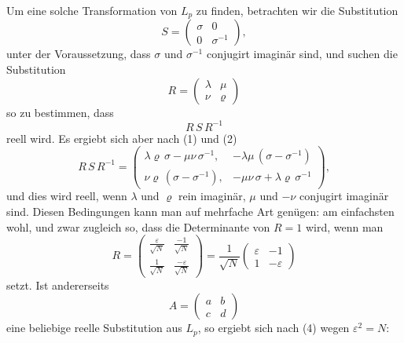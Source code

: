 \documentclass[12pt,a4paper]{article}
\begin{document}
Um eine solche Transformation von $L_{p}$ zu finden, betrachten wir die Substitution
\begin{equation}\label{eq:69.1}
\tag{1}
S = \begin{pmatrix}\sigma&0\\0&\sigma^{-1}\end{pmatrix},
\end{equation}
unter der Voraussetzung, dass $\sigma$ und $\sigma^{-1}$ conjugirt imaginär sind, und suchen die Substitution
\begin{equation}\label{eq:69.2}
\tag{2}
R = \begin{pmatrix}\lambda&\mu\\\nu&\varrho\end{pmatrix}
\end{equation}
so zu bestimmen, dass
\begin{equation}\label{eq:69.3}
\tag{3}
R\,S\,R^{-1}
\end{equation}
reell wird. Es ergiebt sich aber nach (1) und (2)
\[
R\,S\,R^{-1} =
\begin{pmatrix}
\lambda\varrho\,\sigma - \mu\nu\,\sigma^{-1},&
-\lambda\mu\,(\sigma - \sigma^{-1})\\
\nu\varrho\,(\sigma - \sigma^{-1}),&
-\mu\nu\,\sigma + \lambda\varrho\,\sigma^{-1}
\end{pmatrix},
\]
und dies wird reell, wenn $\lambda$ und $\varrho$ rein imaginär, $\mu$ und $-\nu$ conjugirt imaginär sind. Diesen Bedingungen kann man auf mehrfache Art genügen: am einfachsten wohl, und zwar zugleich so, dass die Determinante von $R = 1$ wird, wenn man
\begin{equation}\label{eq:69.4}
\tag{4}
R = \begin{pmatrix}
\frac{\varepsilon}{\sqrt{N}}&\frac{-1}{\sqrt{N}}\\[4pt]
\frac{1}{\sqrt{N}}&\frac{-\varepsilon}{\sqrt{N}}
\end{pmatrix}
= \frac{1}{\sqrt{N}}\begin{pmatrix}\varepsilon&-1\\1&-\varepsilon\end{pmatrix}
\end{equation}
setzt. Ist andererseits
\[
A = \begin{pmatrix}a&b\\c&d\end{pmatrix}
\]
eine beliebige reelle Substitution aus $L_{p}$, so ergiebt sich nach (4) wegen $\varepsilon^{2} = N$:

\newpage
{}
\end{document}

